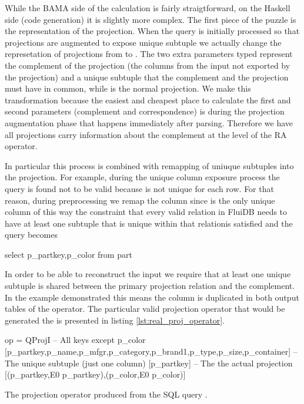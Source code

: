 While the BAMA side of the calculation is fairly straigtforward, on
the Haskell side (code generation) it is slightly more complex. The
first piece of the puzzle is the representation of the
projection. When the query is initially processed so that projections
are augmented to expose unique subtuple we actually change the
represetation of projections from  to
. The two extra parameters typed
\hask{[e]} represent the complement of the projection (the columns
from the input not exported by the projection) and a unique subtuple
that the complement and the projection must have in common, while
\hask{[(e,Expr e)]} is the normal projection. We make this
transformation because the easiest and cheapest place to calculate the
first and second parameters (complement and correspondence) is during
the projection augmentation phase that happens immediately after
parsing. Therefore we have all projections carry information about the
complement at the level of the RA operator.

In particular this process is combined with remapping of uniuque
subtuples into the projection. For example, during the unique column
exposure process the query  is found not
to be valid because  is not unique for each row. For that
reason, during preprocessing we remap the  column since
 is the only unique column of  this way the
constraint that every valid relation in FluiDB needs to have at least
one subtuple that is unique within that relationis satisfied and the
query becomes

\begin{sqlcode}
select p_partkey,p_color from part
\end{sqlcode}

In order to be able to reconstruct the input we require that at least
one unique subtuple is shared between the primary projection relation
and the complement. In the example demonstrated this means the
 column is duplicated in both output tables of the
operator. The particular valid projection operator that would be
generated the  is presented in listing
\ref{lst:real_proj_operator}.

\begin{code}
\begin{haskellcode}
op =
  QProjI
    -- All keys except p_color
    [p_partkey,p_name,p_mfgr,p_category,p_brand1,p_type,p_size,p_container]
    -- The unique subtuple (just one column)
    [p_partkey]
    -- The the actual projection
    [(p_partkey,E0 p_partkey),(p_color,E0 p_color)]
\end{haskellcode}
  \caption{\label{lst:real_proj_operator}The projection operator
    produced from the SQL query .}
\end{code}

